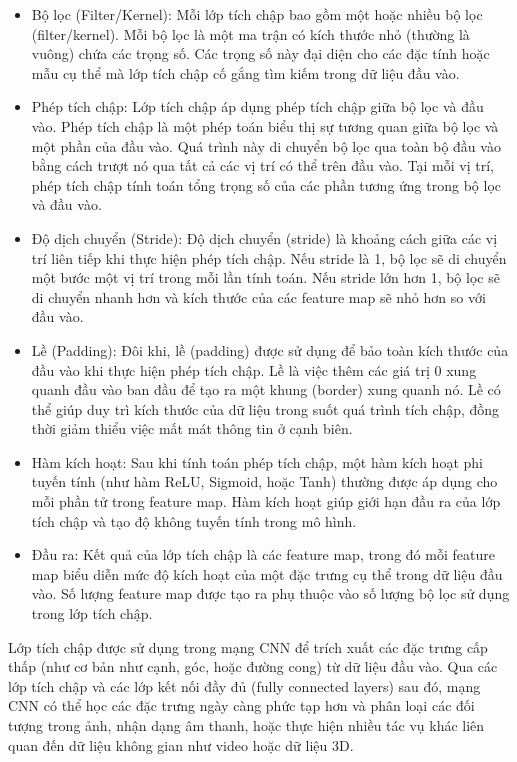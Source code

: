 \begin{itemize}
    \item Bộ lọc (Filter/Kernel): Mỗi lớp tích chập bao gồm một hoặc nhiều bộ lọc (filter/kernel). Mỗi bộ lọc là một ma trận có kích thước nhỏ (thường là vuông) chứa các trọng số. Các trọng số này đại diện cho các đặc tính hoặc mẫu cụ thể mà lớp tích chập cố gắng tìm kiếm trong dữ liệu đầu vào.
    \item Phép tích chập: Lớp tích chập áp dụng phép tích chập giữa bộ lọc và đầu vào. Phép tích chập là một phép toán biểu thị sự tương quan giữa bộ lọc và một phần của đầu vào. Quá trình này di chuyển bộ lọc qua toàn bộ đầu vào bằng cách trượt nó qua tất cả các vị trí có thể trên đầu vào. Tại mỗi vị trí, phép tích chập tính toán tổng trọng số của các phần tương ứng trong bộ lọc và đầu vào.
    \item Độ dịch chuyển (Stride): Độ dịch chuyển (stride) là khoảng cách giữa các vị trí liên tiếp khi thực hiện phép tích chập. Nếu stride là 1, bộ lọc sẽ di chuyển một bước một vị trí trong mỗi lần tính toán. Nếu stride lớn hơn 1, bộ lọc sẽ di chuyển nhanh hơn và kích thước của các feature map sẽ nhỏ hơn so với đầu vào.
    \item Lề (Padding): Đôi khi, lề (padding) được sử dụng để bảo toàn kích thước của đầu vào khi thực hiện phép tích chập. Lề là việc thêm các giá trị 0 xung quanh đầu vào ban đầu để tạo ra một khung (border) xung quanh nó. Lề có thể giúp duy trì kích thước của dữ liệu trong suốt quá trình tích chập, đồng thời giảm thiểu việc mất mát thông tin ở cạnh biên.
    \item Hàm kích hoạt: Sau khi tính toán phép tích chập, một hàm kích hoạt phi tuyến tính (như hàm ReLU, Sigmoid, hoặc Tanh) thường được áp dụng cho mỗi phần tử trong feature map. Hàm kích hoạt giúp giới hạn đầu ra của lớp tích chập và tạo độ không tuyến tính trong mô hình.
    \item Đầu ra: Kết quả của lớp tích chập là các feature map, trong đó mỗi feature map biểu diễn mức độ kích hoạt của một đặc trưng cụ thể trong dữ liệu đầu vào. Số lượng feature map được tạo ra phụ thuộc vào số lượng bộ lọc sử dụng trong lớp tích chập.
\end{itemize}

Lớp tích chập được sử dụng trong mạng CNN để trích xuất các đặc trưng cấp thấp (như cơ bản như cạnh, góc, hoặc đường cong) từ dữ liệu đầu vào. Qua các lớp tích chập và các lớp kết nối đầy đủ (fully connected layers) sau đó, mạng CNN có thể học các đặc trưng ngày càng phức tạp hơn và phân loại các đối tượng trong ảnh, nhận dạng âm thanh, hoặc thực hiện nhiều tác vụ khác liên quan đến dữ liệu không gian như video hoặc dữ liệu 3D.


